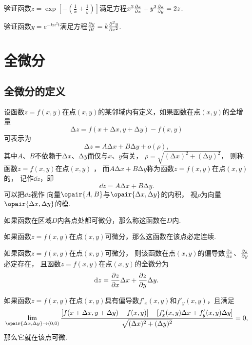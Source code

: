\begin{example}
验证函数\(z = \exp[-\left(\frac{1}{x}+\frac{1}{y}\right)]\)满足方程\(x^2 \pdv{z}{x} + y^2 \pdv{z}{y} = 2z\).
\end{example}

\begin{example}
验证函数\(y = e^{-k n^2 t}\)满足方程\(\pdv{y}{t} = k \pdv[2]{y}{x}\).
\end{example}

\section{全微分}
\subsection{全微分的定义}
\begin{definition}
设函数\(z=f(x,y)\)在点\((x,y)\)的某邻域内有定义，如果函数在点\((x,y)\)的全增量\[
\increment z = f(x+\increment x,y+\increment y)-f(x,y)
\]可表示为\[
\increment z = A \increment x + B \increment y + o(\rho),
\]其中\(A\)、\(B\)不依赖于\(\increment x\)、\(\increment y\)而仅与\(x\)、\(y\)有关，
\(\rho=\sqrt{(\increment x)^2+(\increment y)^2}\)，
则称函数\(z=f(x,y)\)在点\((x,y)\) ，
而\(A \increment x + B \increment y\)称为函数\(z=f(x,y)\)在点\((x,y)\)的，
记作\(\dd{z}\)，即\[
\dd{z} = A \increment x + B \increment y.
\]可以把\(\dd{z}\)视作%
向量\(\opair{A,B}\)与\(\opair{\increment x,\increment y}\)的内积，
视\(\rho\)为向量\(\opair{\increment x,\increment y}\)的模.

如果函数在区域\(D\)内各点处都可微分，那么称这函数在\(D\)内.
\end{definition}

\begin{theorem}
如果函数\(z=f(x,y)\)在点\((x,y)\)可微分，那么这函数在该点必定连续.
\end{theorem}

\begin{theorem}[必要条件]\label{theorem:多元函数微分法.二元函数可微的必要条件}
如果函数\(z=f(x,y)\)在点\((x,y)\)可微分，
则该函数在点\((x,y)\)的偏导数\(\pdv{z}{x}\)、\(\pdv{z}{y}\)必定存在，
且函数\(z=f(x,y)\)在点\((x,y)\)的全微分为\[
\dd{z} = \pdv{z}{x} \Delta x + \pdv{z}{y} \Delta y.
\]
\end{theorem}

\begin{corollary}
如果函数\(z=f(x,y)\)在点\((x,y)\)具有偏导数\(f'_x(x,y)\)和\(f'_y(x,y)\)，且满足\[
\lim\limits_{\opair{\increment x,\increment y}\to(0,0)}
 \frac{[f(x+\increment x,y+\increment y)-f(x,y)]-[f'_x(x,y) \increment x + f'_y(x,y) \increment y]}{\sqrt{(\increment x)^2+(\increment y)^2}} = 0,
\]那么它就在该点可微.
\end{corollary}

